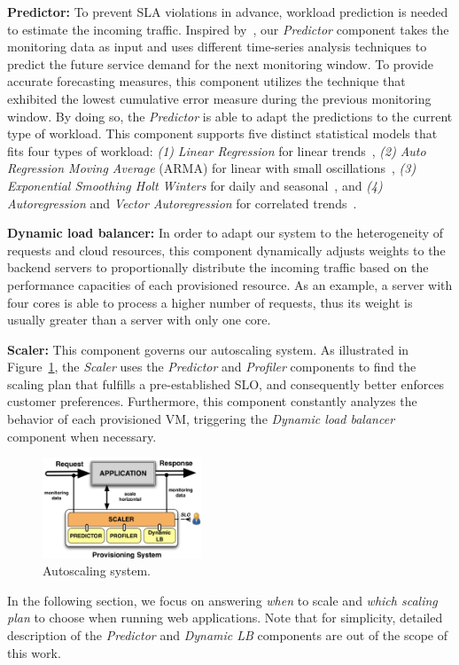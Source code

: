\textbf{Predictor: } To prevent SLA violations in advance, workload prediction is needed to estimate the incoming traffic. Inspired by~\cite{wolski_network_1999}, our \emph{Predictor} component takes the monitoring data as input and uses different time-series analysis techniques to predict the future service demand for the next monitoring window. To provide accurate forecasting measures, this component utilizes the technique that exhibited the lowest cumulative error measure during the previous monitoring window. By doing so, the \emph{Predictor} is able to adapt the predictions to the current type of workload. This component supports five distinct statistical models that fits four types of workload: \emph{(1)} \emph{Linear Regression} for linear trends~\cite{muppala_regression-based_2012}, \emph{(2)} \emph{Auto Regression Moving Average} (ARMA) for linear with small oscillations~\cite{roy_efficient_2011}, \emph{(3)} \emph{Exponential Smoothing Holt Winters} for daily and seasonal~\cite{exponential_smoothing2010}, and \emph{(4)} \emph{Autoregression} and \emph{Vector Autoregression} for correlated trends~\cite{chandra_dynamic_2003}. 




\textbf{Dynamic load balancer: } In order to adapt our system to the heterogeneity of requests and cloud resources, this component dynamically adjusts weights to the backend servers to proportionally distribute the incoming traffic based on the performance capacities of each provisioned resource. As an example, a server with four cores is able to process a higher number of requests, thus its weight is usually greater than a server with only one core.


\textbf{Scaler:} This component governs our autoscaling system. As illustrated in Figure~\ref{autoScalingSys}, the \emph{Scaler} uses the \emph{Predictor} and \emph{Profiler} components to find the scaling plan that fulfills a pre-established SLO, and consequently better enforces customer preferences. Furthermore, this component constantly analyzes the behavior of each provisioned VM, triggering the \emph{Dynamic load balancer} component when necessary.

\begin{figure}[t]
  \begin{center}
    \includegraphics[width=.7\linewidth, height=3cm]{images/monitoringSchema}
  \end{center}
\vspace{-4mm}
  \caption{Autoscaling system.}
  \label{autoScalingSys}
\end{figure}

In the following section, we focus on answering \emph{when} to scale and \emph{which scaling plan} to choose when running web applications. Note that for simplicity, detailed description of the \emph{Predictor} and \emph{Dynamic LB} components are out of the scope of this work.